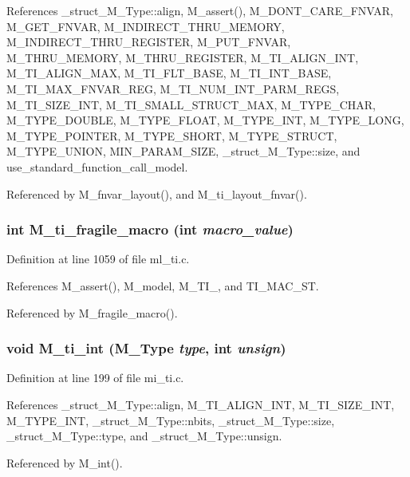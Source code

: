 References \_\-struct\_\-M\_\-Type::align, M\_\-assert(), M\_\-DONT\_\-CARE\_\-FNVAR, M\_\-GET\_\-FNVAR, M\_\-INDIRECT\_\-THRU\_\-MEMORY, M\_\-INDIRECT\_\-THRU\_\-REGISTER, M\_\-PUT\_\-FNVAR, M\_\-THRU\_\-MEMORY, M\_\-THRU\_\-REGISTER, M\_\-TI\_\-ALIGN\_\-INT, M\_\-TI\_\-ALIGN\_\-MAX, M\_\-TI\_\-FLT\_\-BASE, M\_\-TI\_\-INT\_\-BASE, M\_\-TI\_\-MAX\_\-FNVAR\_\-REG, M\_\-TI\_\-NUM\_\-INT\_\-PARM\_\-REGS, M\_\-TI\_\-SIZE\_\-INT, M\_\-TI\_\-SMALL\_\-STRUCT\_\-MAX, M\_\-TYPE\_\-CHAR, M\_\-TYPE\_\-DOUBLE, M\_\-TYPE\_\-FLOAT, M\_\-TYPE\_\-INT, M\_\-TYPE\_\-LONG, M\_\-TYPE\_\-POINTER, M\_\-TYPE\_\-SHORT, M\_\-TYPE\_\-STRUCT, M\_\-TYPE\_\-UNION, MIN\_\-PARAM\_\-SIZE, \_\-struct\_\-M\_\-Type::size, and use\_\-standard\_\-function\_\-call\_\-model.

Referenced by M\_\-fnvar\_\-layout(), and M\_\-ti\_\-layout\_\-fnvar().
\subsubsection{\setlength{\rightskip}{0pt plus 5cm}int M\_\-ti\_\-fragile\_\-macro (int {\em macro\_\-value})}\label{m__ti_8h_25627f2dfedd6c390f72b04a0d380ccc}




Definition at line 1059 of file ml\_\-ti.c.

References M\_\-assert(), M\_\-model, M\_\-TI\_, and TI\_\-MAC\_\-ST.

Referenced by M\_\-fragile\_\-macro().
\subsubsection{\setlength{\rightskip}{0pt plus 5cm}void M\_\-ti\_\-int (\bf{M\_\-Type} {\em type}, int {\em unsign})}\label{m__ti_8h_ccbca4c487f5a8c7616225f25e045dc3}




Definition at line 199 of file mi\_\-ti.c.

References \_\-struct\_\-M\_\-Type::align, M\_\-TI\_\-ALIGN\_\-INT, M\_\-TI\_\-SIZE\_\-INT, M\_\-TYPE\_\-INT, \_\-struct\_\-M\_\-Type::nbits, \_\-struct\_\-M\_\-Type::size, \_\-struct\_\-M\_\-Type::type, and \_\-struct\_\-M\_\-Type::unsign.

Referenced by M\_\-int().
